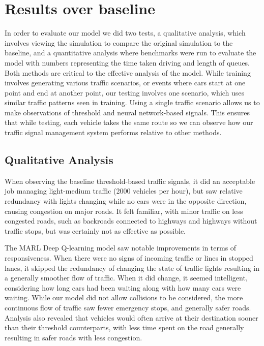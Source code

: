\documentclass[conference]{IEEEtran}
\begin{document}
\section{Results over baseline}

In order to evaluate our model we did two tests, a qualitative analysis, which involves viewing the simulation to compare the original simulation to the baseline, and a quantitative analysis where benchmarks were run to evaluate the model with numbers representing the time taken driving and length of queues. Both methods are critical to the effective analysis of the model. While training involves generating various traffic scenarios, or events where cars start at one point and end at another point, our testing involves one scenario, which uses similar traffic patterns seen in training. Using a single traffic scenario allows us to make observations of threshold and neural network-based signals. This ensures that while testing, each vehicle takes the same route so we can observe how our traffic signal management system performs relative to other methods. 

\subsection{Qualitative Analysis}

When observing the baseline threshold-based traffic signals, it did an acceptable job managing light-medium traffic (2000 vehicles per hour), but saw relative redundancy with lights changing while no cars were in the opposite direction, causing congestion on major roads. It felt familiar, with minor traffic on less congested roads, such as backroads connected to highways and highways without traffic stops, but was certainly not as effective as possible. 

The MARL Deep Q-learning model saw notable improvements in terms of responsiveness. When there were no signs of incoming traffic or lines in stopped lanes, it skipped the redundancy of changing the state of traffic lights resulting in a generally smoother flow of traffic. When it did change, it seemed intelligent, considering how long cars had been waiting along with how many cars were waiting. While our model did not allow collisions to be considered, the more continuous flow of traffic saw fewer emergency stops, and generally safer roads. Analysis also revealed that vehicles would often arrive at their destination sooner than their threshold counterparts, with less time spent on the road generally resulting in safer roads with less congestion.  
\end{document}
